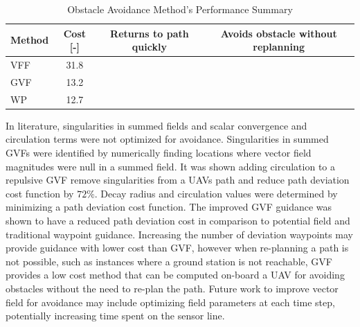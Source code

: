 \documentclass[conf]{new-aiaa}
\begin{document}
\begin{table}[H]
	\centering
	\caption{Obstacle Avoidance Method's Performance Summary }
	\label{table}
	\begin{tabular}{|l|c|c|c|}
		\hline
		\multicolumn{1}{|c|}{Method} & Cost {[}-{]} & Returns to path quickly & Avoids obstacle without replanning \\ \hline
		VFF                          & 31.8         &                         & \Checkmark
		\\ \hline
		GVF                          & 13.2         & \Checkmark                       & \Checkmark                                  \\ \hline
		WP                           & 12.7         & \Checkmark                       &                                    \\ \hline
	\end{tabular}
\end{table}

In literature, singularities in summed fields and scalar convergence and circulation terms were not optimized for avoidance. Singularities in summed GVFs were identified by numerically finding locations where vector field magnitudes were null in a summed field. It was shown adding circulation to a repulsive GVF remove singularities from a UAVs path and reduce path deviation cost function by $72 \%$. Decay radius and circulation values were determined by minimizing a path deviation cost function. The improved GVF guidance was shown to have a reduced path deviation cost in comparison to potential field and traditional waypoint guidance. Increasing the number of deviation waypoints may provide guidance with lower cost than GVF, however when re-planning a path is not possible, such as instances where a ground station is not reachable, GVF provides a low cost method that can be computed on-board a UAV for avoiding obstacles without the need to re-plan the path. Future work to improve vector field for avoidance may include optimizing field parameters at each time step, potentially increasing time spent on the sensor line. 
\end{document}
